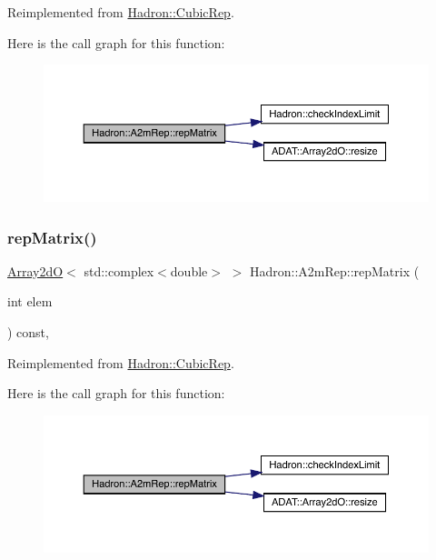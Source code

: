 Reimplemented from \mbox{\hyperlink{structHadron_1_1CubicRep_ac5d7e9e6f4ab1158b5fce3e4ad9e8005}{Hadron\+::\+Cubic\+Rep}}.

Here is the call graph for this function\+:
\nopagebreak
\begin{figure}[H]
\begin{center}
\leavevmode
\includegraphics[width=350pt]{da/db3/structHadron_1_1A2mRep_a02575a23902366eafe355b1c36667754_cgraph}
\end{center}
\end{figure}
\mbox{\label{structHadron_1_1A2mRep_a02575a23902366eafe355b1c36667754}} 
\subsubsection{\texorpdfstring{repMatrix()}{repMatrix()}\hspace{0.1cm}{\footnotesize\ttfamily [3/3]}}
{\footnotesize\ttfamily \mbox{\hyperlink{classADAT_1_1Array2dO}{Array2dO}}$<$ std\+::complex$<$double$>$ $>$ Hadron\+::\+A2m\+Rep\+::rep\+Matrix (\begin{DoxyParamCaption}\item[{int}]{elem }\end{DoxyParamCaption}) const\hspace{0.3cm}{\ttfamily [inline]}, {\ttfamily [virtual]}}



Reimplemented from \mbox{\hyperlink{structHadron_1_1CubicRep_ac5d7e9e6f4ab1158b5fce3e4ad9e8005}{Hadron\+::\+Cubic\+Rep}}.

Here is the call graph for this function\+:
\nopagebreak
\begin{figure}[H]
\begin{center}
\leavevmode
\includegraphics[width=350pt]{da/db3/structHadron_1_1A2mRep_a02575a23902366eafe355b1c36667754_cgraph}
\end{center}
\end{figure}



